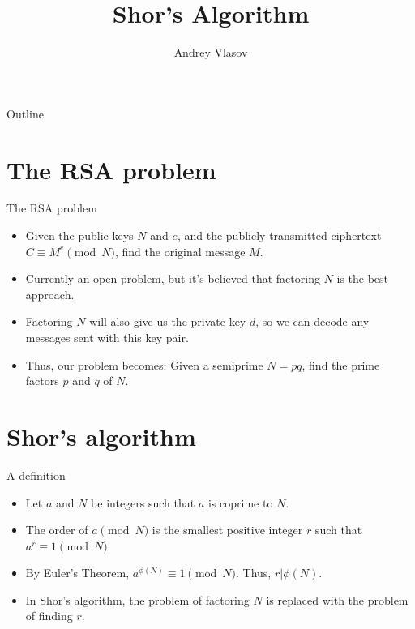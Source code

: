 \documentclass[handout, aspectratio=169]{beamer}
\title{Shor's Algorithm}
\author{Andrey Vlasov}
\date{}
\begin{document}

\begin{frame}
\titlepage
\end{frame}

\begin{frame}{Outline}
  \tableofcontents
\end{frame}

\section{The RSA problem}
\frame{\sectionpage}
\begin{frame}{The RSA problem}
    \begin{itemize}
        \item Given the public keys $N$ and $e$, and the publicly transmitted ciphertext $C\equiv M^e\pmod N$, find the original message $M$. \pause
        \item Currently an open problem, but it's believed that factoring $N$ is the best approach. \pause
        \item Factoring $N$ will also give us the private key $d$, so we can decode any messages sent with this key pair. \pause
        \item Thus, our problem becomes: Given a semiprime $N=pq$, find the prime factors $p$ and $q$ of $N$. \pause
    \end{itemize}
\end{frame}

\section{Shor's algorithm}
\frame{\sectionpage}

\begin{frame}{A definition}
    \begin{itemize}
        \item Let $a$ and $N$ be integers such that $a$ is \textcolor{sigma@mainblue}{coprime to $N$}. \pause
        \item The order of $a\pmod N$ is the \textcolor{sigma@mainblue}{smallest} positive integer $r$ such that $a^r\equiv 1\pmod N$. \pause
        \item By Euler's Theorem, $a^{\phi(N)}\equiv 1\pmod N$. Thus, $r|\phi(N)$. \pause
        \item In Shor's algorithm, the problem of factoring $N$ is replaced with the problem of finding $r$.
    \end{itemize}
\end{frame}
\end{document}
